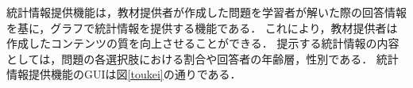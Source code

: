 統計情報提供機能は，教材提供者が作成した問題を学習者が解いた際の回答情報を基に，グラフで統計情報を提供する機能である．
これにより，教材提供者は作成したコンテンツの質を向上させることができる．
提示する統計情報の内容としては，問題の各選択肢における割合や回答者の年齢層，性別である．
統計情報提供機能のGUIは図\ref{toukei}の通りである．